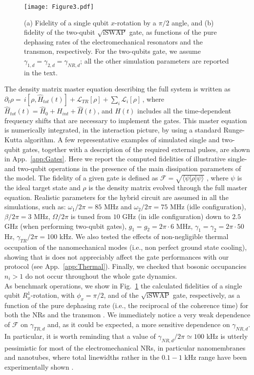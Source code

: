 \documentclass[aps,twocolumn,groupedaddress,superscriptaddress,floatfix,amsmath,amssymb,prb]{revtex4-1}
\begin{document}
\begin{figure}[t]
\texttt{[image: Figure3.pdf]} 
\caption{(a) Fidelity of a single qubit $x$-rotation by a $\pi/2$ angle, and (b) fidelity of the two-qubit $\sqrt{\text{iSWAP}}$ gate, as functions of the pure dephasing rates of the electromechanical resonators and the transmon, respectively. 
For the two-qubits gate, we assume $\gamma_{1,d} = \gamma_{2,d} =\gamma_{NR,d}$; all the other simulation parameters are reported in the text.}
\label{fig:FidScan}
\end{figure}

The density matrix master equation describing the full system is written as
$\partial_t \rho = \, i [ {\rho}, \hat{H}_{tot}(t)] + \mathcal{L}_{TR}[\rho] + \sum_i \mathcal{L}_i [\rho] \,$,
where $\hat{H}_{tot}(t) = \hat{H}_{0}+H_{int} + \hat{H}(t)$, and $H(t)$ includes all the time-dependent frequency shifts that are necessary to implement the gates. 
This master equation is numerically integrated, in the interaction picture, by using a standard Runge-Kutta algorithm.
A few representative examples of simulated single and two-qubit gates, together with a description of the required external pulses, are shown in App.~\ref{app:Gates}.  
Here we report the computed fidelities of illustrative single- and two-qubit operations in the presence of the main dissipation parameters of the model. 
The fidelity of a given gate is defined as $\mathcal{F}=\sqrt{\langle \psi | \rho | \psi\rangle}$ \cite{Nielsen}, where $\psi$ is the ideal target state and $\rho$ is the density matrix evolved through the full master equation. 
Realistic parameters for the hybrid circuit are assumed in all the simulations, such as: $\omega_1/ 2\pi = 85$ MHz and $\omega_2 /2\pi = 75$ MHz (idle configuration), $\beta /2\pi = 3$ MHz, $\Omega/2\pi$ is tuned from $10$ GHz (in idle configuration) down to $2.5$ GHz (when performing two-qubit gates), $g_1=g_2 =2\pi\cdot 6$ MHz, $\gamma_{1}=\gamma_2 = 2\pi\cdot 50$ Hz, $\gamma_{TR}/2\pi=$100 kHz. We also tested the effects of non-negligible thermal occupation of the nanomechanical modes (i.e., non perfect ground state cooling), showing that is does not appreciably affect the gate performances with our protocol (see App.~\ref{app:Thermal}). 
Finally, we checked that bosonic occupancies $n_i>1$ do not occur throughout the whole gate dynamics. \\
As benchmark operations, we show in Fig.~\ref{fig:FidScan} the calculated fidelities of a single qubit $R_x^1$-rotation, with $\phi_{x} = \pi/2$, and of the $\sqrt{\text{iSWAP}}$ gate, respectively, as a function of the pure dephasing rate (i.e., the reciprocal of the coherence time) for both the NRs and the transmon \cite{random}. We immediately notice a very weak dependence of $\mathcal{F}$ on $\gamma_{TR,d}$ and, as it could be expected, a more sensitive dependence on $\gamma_{NR,d}$. In particular, it is worth reminding that a value of $\gamma_{NR,d} / 2\pi\simeq 100$ kHz is utterly pessimistic for most of the electromechanical NRs, in particular nanomembranes and nanotubes, where total linewidths rather in the $0.1 - 1$ kHz range have been experimentally shown \cite{Singh2014,Weber2014,Moser2014}.   
\end{document}
